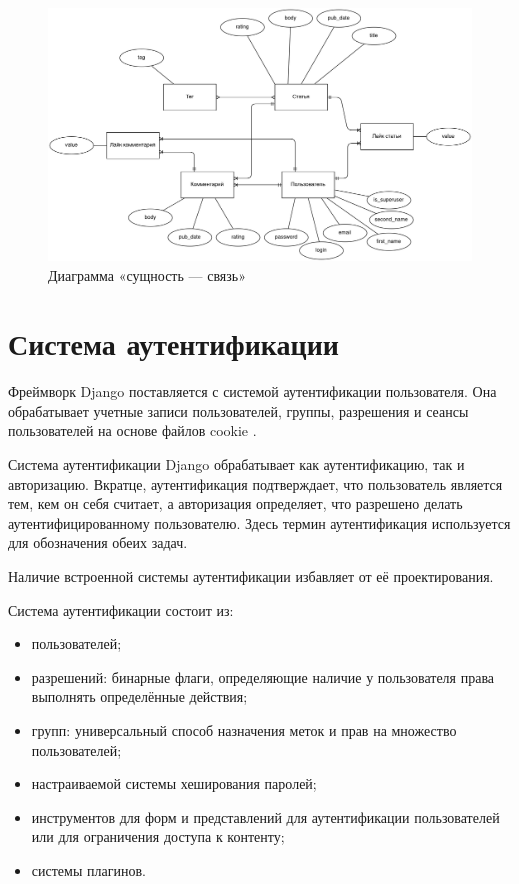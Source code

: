 \begin{figure}[H]
	\centering
	\includegraphics[width=\linewidth]{inc/img/er}
	\caption{Диаграмма «сущность — связь»}
	\label{img:er}
\end{figure}

\section{Система аутентификации}

Фреймворк Django поставляется с системой аутентификации пользователя.
Она обрабатывает учетные записи пользователей, группы, разрешения и сеансы пользователей на основе файлов cookie \cite{django}.

Система аутентификации Django обрабатывает как аутентификацию, так и авторизацию.
Вкратце, аутентификация подтверждает, что пользователь является тем, кем он себя считает, а авторизация определяет, что разрешено делать аутентифицированному пользователю.
Здесь термин аутентификация используется для обозначения обеих задач.

Наличие встроенной системы аутентификации избавляет от её проектирования.

Система аутентификации состоит из:
\begin{itemize}
	\item пользователей;
	\item разрешений: бинарные флаги, определяющие наличие у пользователя права выполнять определённые действия;
	\item групп: универсальный способ назначения меток и прав на множество пользователей;
	\item настраиваемой системы хеширования паролей;
	\item инструментов для форм и представлений для аутентификации пользователей или для ограничения доступа к контенту;
	\item системы плагинов.
\end{itemize}

